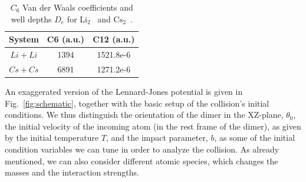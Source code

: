 \documentclass[%
 reprint,
 amsmath,amssymb,
 aps,
10pt
]{revtex4-1}
\begin{document}
\begin{table}
\begin{center}
 \begin{tabular}{|c c c|} 
 \hline
 System & C6 (a.u.) & C12 (a.u.)\\ 
 \hline\hline
$Li + Li$ & 1394 & 1521.8e-6 \\ 
 \hline
 $Cs + Cs$ & 6891 & 1271.2e-6 \\
 \hline
\end{tabular}
\caption{$C_6$ Van der Waals coefficients and well depths $D_e$ for $\mathrm{Li_2}$~\cite{dattani2011} and $\mathrm{Cs_2}$~\cite{xie2009}.}
\label{table:coeffs}
\end{center}
\end {table}

An exaggerated version of the Lennard-Jones potential is given in Fig.~\ref{fig:schematic}, together with the basic setup of the collision's initial conditions. We thus distinguish the orientation of the dimer in the XZ-plane, $\theta_0$, the initial velocity of the incoming atom (in the rest frame of the dimer), as given by the initial temperature $T$, and the impact parameter, $b$, as some of the initial condition variables we can tune in order to analyze the collision. As already mentioned, we can also consider different atomic species, which changes the masses and the interaction strengths.
\end{document}
